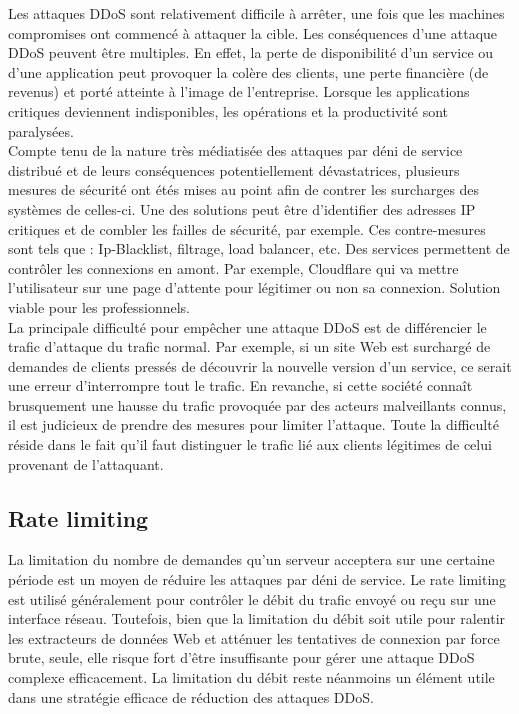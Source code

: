 	Les attaques DDoS sont relativement difficile à arrêter, une fois que les machines compromises ont commencé à attaquer la cible. Les conséquences d’une attaque DDoS peuvent être multiples. En effet, la perte de disponibilité d’un service ou d’une application peut provoquer la colère des clients, une perte financière (de revenus) et porté atteinte à l’image de l’entreprise. Lorsque les applications critiques deviennent indisponibles, les opérations et la productivité sont paralysées.\\

	Compte tenu de la nature très médiatisée des attaques par déni de service distribué et de leurs conséquences potentiellement dévastatrices, plusieurs mesures de sécurité ont étés mises au point afin de contrer les surcharges des systèmes de celles-ci.   
Une des solutions peut être d’identifier des adresses IP critiques et de combler les failles de sécurité, par exemple. Ces contre-mesures sont tels que : Ip-Blacklist, filtrage, load balancer, etc.
Des services permettent de contrôler les connexions en amont. Par exemple, Cloudflare qui va mettre l’utilisateur sur une page d’attente pour légitimer ou non sa connexion. Solution viable pour les professionnels.\\

	La principale difficulté pour empêcher une attaque DDoS est de différencier le trafic d'attaque du trafic normal. Par exemple, si un site Web est surchargé de demandes de clients pressés de découvrir la nouvelle version d'un service, ce serait une erreur d'interrompre tout le trafic. En revanche, si cette société connaît brusquement une hausse du trafic provoquée par des acteurs malveillants connus, il est judicieux de prendre des mesures pour limiter l'attaque. Toute la difficulté réside dans le fait qu'il faut distinguer le trafic lié aux clients légitimes de celui provenant de l'attaquant.

	\subsection{Rate limiting}
	La limitation du nombre de demandes qu'un serveur acceptera sur une certaine période est un moyen de réduire les attaques par déni de service. Le rate limiting est utilisé généralement pour contrôler le débit du trafic envoyé ou reçu sur une interface réseau. Toutefois, bien que la limitation du débit soit utile pour ralentir les extracteurs de données Web et atténuer les tentatives de connexion par force brute, seule, elle risque fort d'être insuffisante pour gérer une attaque DDoS complexe efficacement. La limitation du débit reste néanmoins un élément utile dans une stratégie efficace de réduction des attaques DDoS.

